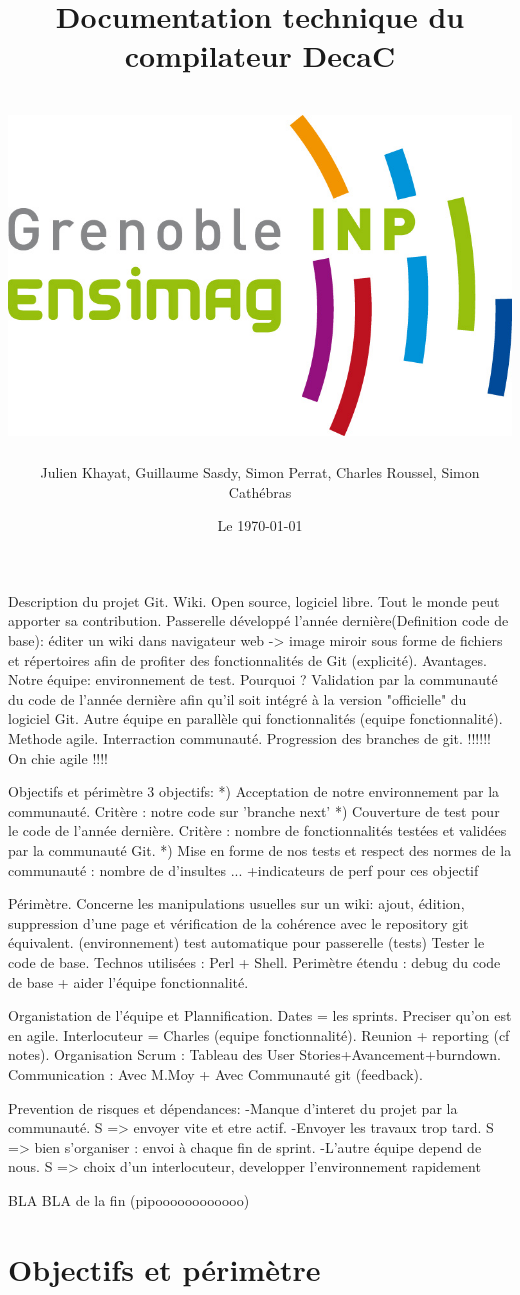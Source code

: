 \documentclass[11pt]{article}
\title{Documentation technique du compilateur DecaC\\
~\\
\includegraphics[scale=0.75]{logo_ensimag.jpg} 
}
\author{Julien Khayat, Guillaume Sasdy, Simon Perrat, Charles Roussel, Simon Cathébras}
\date{Le \today}
\begin{document}
Description du projet
Git. Wiki. Open source, logiciel libre. Tout le monde peut apporter sa contribution. Passerelle développé l'année dernière(Definition code de base):  éditer un wiki dans navigateur web -> image miroir sous forme de fichiers et répertoires afin de profiter des                fonctionnalités de Git (explicité). Avantages.
Notre équipe: environnement de test. Pourquoi ? Validation par la communauté du code de l'année dernière afin qu'il soit     intégré à la version "officielle" du logiciel Git.
Autre équipe en parallèle qui fonctionnalités (equipe fonctionnalité).
Methode agile. Interraction communauté. Progression des branches de git.
!!!!!! On chie agile !!!!

Objectifs et périmètre
3 objectifs:
*) Acceptation de notre environnement par la communauté. Critère : notre code sur 'branche next'
*) Couverture de test pour le code de l'année dernière. Critère : nombre de fonctionnalités testées et validées par la       communauté Git.
*) Mise en forme de nos tests et respect des normes de la communauté : nombre de d'insultes ...
+indicateurs de perf pour ces objectif

Périmètre. Concerne les manipulations usuelles sur un wiki: ajout, édition, suppression d'une page et vérification de la     cohérence avec le repository git équivalent. (environnement)
test automatique pour passerelle (tests)
Tester le code de base. Technos utilisées : Perl + Shell.
Perimètre étendu : debug du code de base + aider l'équipe fonctionnalité.

Organistation de l'équipe et Plannification.
	Dates = les sprints.
	Preciser qu'on est en agile.
	Interlocuteur = Charles (equipe fonctionnalité).
	Reunion + reporting (cf notes).
	Organisation Scrum : Tableau des User Stories+Avancement+burndown.
	Communication : Avec M.Moy + Avec Communauté git (feedback).
	
	Prevention de risques et dépendances:
		-Manque d'interet du projet par la communauté. S => envoyer vite et 		etre actif.
		-Envoyer les travaux trop tard. S => bien s'organiser : envoi à 			chaque fin de sprint.
		-L'autre équipe depend de nous. S => choix d'un interlocuteur, 				developper l'environnement rapidement
	
BLA BLA de la fin (pipoooooooooooo)

\maketitle

\section{Objectifs et périmètre}
\end{document}
